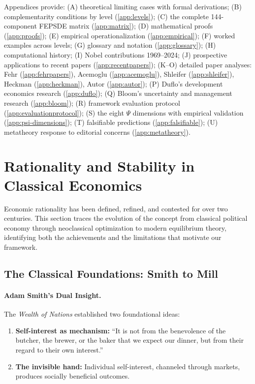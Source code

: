 \documentclass[12pt,a4paper]{article}
\begin{document}
Appendices provide: (A) theoretical limiting cases with formal derivations; (B) complementarity conditions by level (\ref{app:levels}); (C) the complete 144-component FEPSDE matrix (\ref{app:matrix}); (D) mathematical proofs (\ref{app:proofs}); (E) empirical operationalization (\ref{app:empirical}); (F) worked examples across levels; (G) glossary and notation (\ref{app:glossary}); (H) computational history; (I) Nobel contributions 1969--2024; (J) prospective applications to recent papers (\ref{app:recentpapers}); (K--O) detailed paper analyses: Fehr (\ref{app:fehrpapers}), Acemoglu (\ref{app:acemoglu}), Shleifer (\ref{app:shleifer}), Heckman (\ref{app:heckman}), Autor (\ref{app:autor}); (P) Duflo's development economics research (\ref{app:duflo}); (Q) Bloom's uncertainty and management research (\ref{app:bloom}); (R) framework evaluation protocol (\ref{app:evaluationprotocol}); (S) the eight $\Psi$ dimensions with empirical validation (\ref{app:psi-dimensions}); (T) falsifiable predictions (\ref{app:falsifiable}); (U) metatheory response to editorial concerns (\ref{app:metatheory}).

\section{Rationality and Stability in Classical Economics}
\label{sec:classicalrationality}

Economic rationality has been defined, refined, and contested for over two centuries.
This section traces the evolution of the concept from classical political economy
through neoclassical optimization to modern equilibrium theory,
identifying both the achievements and the limitations that motivate our framework.

\subsection{The Classical Foundations: Smith to Mill}

\paragraph{Adam Smith's Dual Insight.}
The \emph{Wealth of Nations} \citep{smith1776} established two foundational ideas:
\begin{enumerate}
  \item \textbf{Self-interest as mechanism:} ``It is not from the benevolence of the butcher, 
        the brewer, or the baker that we expect our dinner, but from their regard to their own interest.''
  \item \textbf{The invisible hand:} Individual self-interest, channeled through markets,
        produces socially beneficial outcomes.
\end{enumerate}
\end{document}
